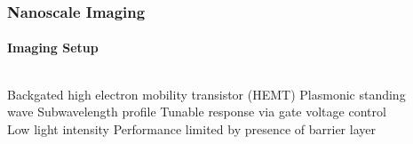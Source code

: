 \documentclass[mathserif,16pt,xcolor=table]{beamer}
\begin{document}
      \begin{frame}
        \frametitle{Nanoscale Imaging}
        \framesubtitle{Imaging Setup}
        \begin{columns}[T] %
          \begin{column}{.4\textwidth}
            \begin{outline}[itemize]
              \1 Backgated high electron mobility transistor (HEMT)
                \2 Plasmonic standing wave
                \2 Subwavelength profile
              \1 Tunable response via gate voltage control
              \1 Low light intensity
              \1 Performance limited by presence of barrier layer
            \end{outline}
          \end{column}
          \begin{column}[T]{.6\textwidth}
            \begin{figure}
              \centering \hspace*{-.8cm}
              \fontsize{6}{7}\selectfont
              \def\svgwidth{1.1\linewidth}
              
              \label{fig:struct}
            \end{figure}
            \end{column}%
          \end{columns}
        \end{frame}
\end{document}

